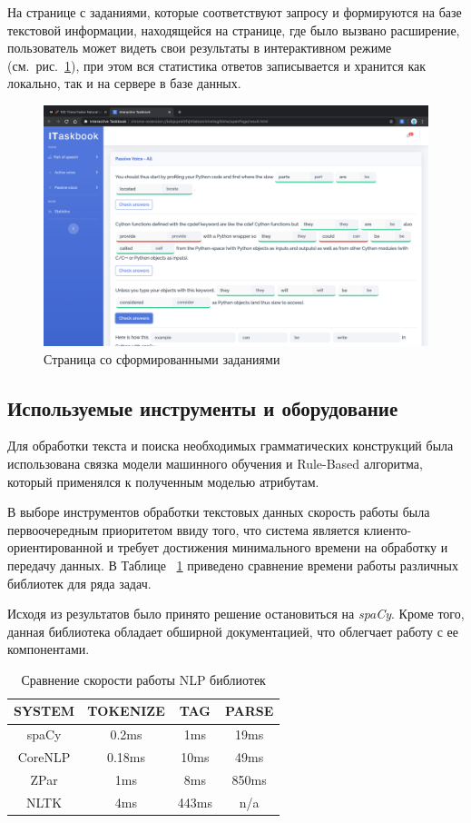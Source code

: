 На странице с заданиями, которые соответствуют запросу и  формируются на базе текстовой информации, находящейся на странице, где было вызвано расширение, пользователь может видеть свои результаты в интерактивном режиме (см.~рис.~\ref{fig:tasks-example}), при этом вся статистика ответов записывается и хранится как локально, так и на сервере в базе данных.
\begin{figure}[p]
\centering
\includegraphics[width=\textwidth]{img/tasks-example}
\caption{\label{fig:tasks-example}Страница со сформированными заданиями}
\end{figure}


\newpage

\subsection{Используемые инструменты и оборудование}
Для обработки текста и поиска необходимых грамматических конструкций была использована связка модели машинного обучения и Rule-Based алгоритма, который применялся к полученным моделью атрибутам.

В выборе инструментов обработки текстовых данных скорость работы была первоочередным приоритетом ввиду того, что система является клиенто-ориентированной и требует достижения минимального времени на обработку и передачу данных. В Таблице ~\ref{tab:nlp-speed} приведено сравнение времени работы различных библиотек для ряда задач.

Исходя из результатов было принято решение остановиться на \emph{spaCy}. Кроме того, данная библиотека обладает обширной документацией, что облегчает работу с ее компонентами.

\begin{table}
\centering
\caption{\label{tab:nlp-speed}Сравнение скорости работы NLP библиотек}
\begin{tabular}{@{}cccc@{}}
\toprule
SYSTEM  & TOKENIZE & TAG   & PARSE \\ \midrule
spaCy   & 0.2ms    & 1ms   & 19ms  \\
CoreNLP & 0.18ms   & 10ms  & 49ms  \\
ZPar    & 1ms      & 8ms   & 850ms \\
NLTK    & 4ms      & 443ms & n/a   \\ \bottomrule
\end{tabular}
\end{table}

